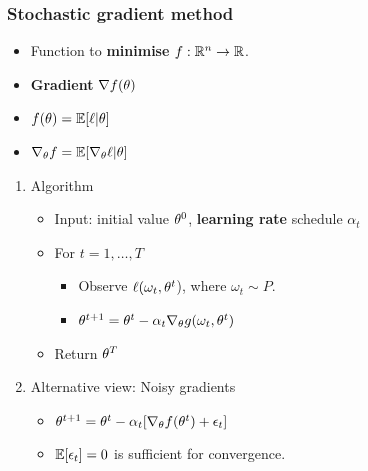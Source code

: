 \documentclass[smaller]{article}
\begin{document}
\subsubsection{Stochastic gradient method}
\label{sec:orgcc061a4}
\begin{itemize}
\item Function to \textbf{minimise} \(f : \mathbb{R}^n \to \mathbb{R}\).
\item \textbf{Gradient} \(\nabla f(\theta)\)
\item \(f(\theta) = \mathop{\mbox{\ensuremath{\mathbb{E}}}}\nolimits[\ell | \theta]\)
\item \(\nabla_\theta f = \mathop{\mbox{\ensuremath{\mathbb{E}}}}\nolimits[ \nabla_\theta \ell | \theta]\)
\end{itemize}
\begin{enumerate}
\item Algorithm
\label{sec:orgb88a199}
\begin{itemize}
\item Input: initial value \(\theta^0\), \textbf{learning rate} schedule \(\alpha_t\)
\item For \(t=1, \ldots, T\)
\begin{itemize}
\item Observe \(\ell(\omega_t, \theta^t\)), where \(\omega_t \sim P\).
\item \(\theta^{t+1} = \theta^t - \alpha_t \nabla_\theta g(\omega_t, \theta^t)\)
\end{itemize}
\item Return \(\theta^T\)
\end{itemize}

\item Alternative view: Noisy gradients
\label{sec:org7721a92}
\begin{itemize}
\item \(\theta^{t+1} = \theta^t - \alpha_t [\nabla_\theta f(\theta^t) + \epsilon_t]\)
\item \(\mathop{\mbox{\ensuremath{\mathbb{E}}}}\nolimits[\epsilon_t] = 0\) is sufficient for convergence.
\end{itemize}
\end{enumerate}
\end{document}
